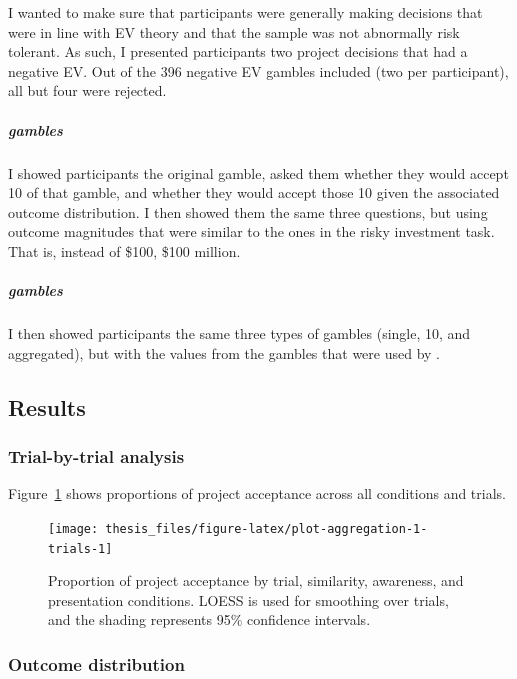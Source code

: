 \documentclass[a4paper, nobind, dvipsnames]{templates/ociamthesis}
\theoremstyle{definition}
\theoremstyle{definition}
\theoremstyle{definition}
\theoremstyle{definition}
\theoremstyle{remark}
\begin{document}
I wanted to make sure that participants were generally making decisions that
were in line with EV theory and that the sample was not abnormally risk
tolerant. As such, I presented participants two project decisions that had a
negative EV. Out of the 396 negative EV
gambles included (two per participant), all but
four were rejected.

\subparagraph{\texorpdfstring{\textcite{samuelson1963} gambles}{Samuelson (1963) gambles}}

I showed participants the original \textcite{samuelson1963} gamble, asked them whether
they would accept 10 of that gamble, and whether they would accept those 10
given the associated outcome distribution. I then showed them the same three
questions, but using outcome magnitudes that were similar to the ones in the
risky investment task. That is, instead of \$100, \$100 million.

\subparagraph{\texorpdfstring{\textcite{redelmeier1992} gambles}{Redelmeier \& Tversky (1992) gambles}}

I then showed participants the same three types of gambles (single, 10, and
aggregated), but with the values from the gambles that were used by
\textcite{redelmeier1992}.

\hypertarget{results-aggregation-1-appendix}{%
\subsection{Results}\label{results-aggregation-1-appendix}}

\hypertarget{trial-by-trial-aggregation-1}{%
\subsubsection{Trial-by-trial analysis}\label{trial-by-trial-aggregation-1}}

Figure~\ref{fig:plot-aggregation-1-trials} shows proportions of project
acceptance across all conditions and trials.



\begin{figure}
\texttt{[image: thesis\_files/figure-latex/plot-aggregation-1-trials-1]} \caption{Proportion of project acceptance by trial, similarity, awareness, and presentation conditions. LOESS is used for smoothing over trials, and the shading represents 95\% confidence intervals.}\label{fig:plot-aggregation-1-trials}
\end{figure}

\hypertarget{outcome-distribution-aggregation-1}{%
\subsubsection{Outcome distribution}\label{outcome-distribution-aggregation-1}}
\end{document}
